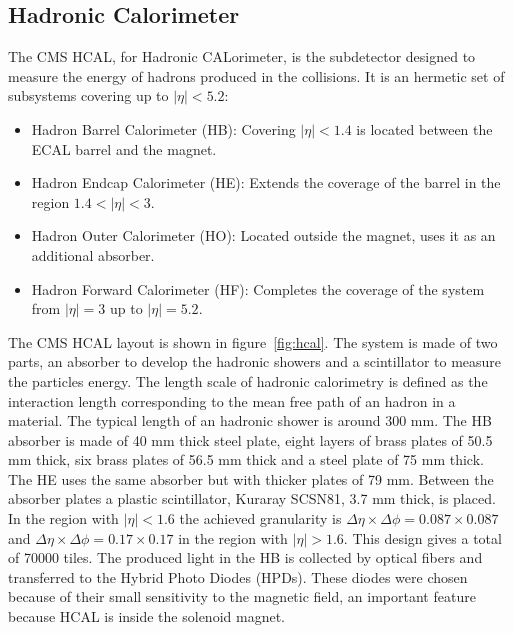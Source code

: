
\subsection{Hadronic Calorimeter}
\label{sec:hcal}

The CMS HCAL, for Hadronic CALorimeter, is the subdetector designed to measure the energy of hadrons produced in the collisions. It is an hermetic set of subsystems covering up to $|\eta|<5.2$:
\begin{itemize}
\item Hadron Barrel Calorimeter (HB): Covering $|\eta|<1.4$ is located between the ECAL barrel and the magnet. 
\item Hadron Endcap Calorimeter (HE): Extends the coverage of the barrel in the region $1.4<|\eta|<3$.
\item Hadron Outer Calorimeter (HO): Located outside the magnet, uses it as an additional absorber.
\item Hadron Forward Calorimeter (HF): Completes the coverage of the system from $|\eta|=3$ up to $|\eta|=5.2$.
\end{itemize}

The CMS HCAL layout is shown in figure~\ref{fig:hcal}. The system is made of two parts, an absorber to develop the hadronic showers and a scintillator to measure the particles energy. The length scale of hadronic calorimetry is defined as the interaction length corresponding to the mean free path of an hadron in a material. The typical length of an hadronic shower is around 300 mm. The HB absorber is made of 40 mm thick steel plate, eight layers of brass plates of 50.5 mm thick, six brass plates of 56.5 mm thick and a steel plate of 75 mm thick. The HE uses the same absorber but with thicker plates of 79 mm. Between the absorber plates a plastic scintillator, Kuraray SCSN81, 3.7 mm thick, is placed. In the region with $|\eta|<1.6$ the achieved granularity is $\Delta\eta\times\Delta\phi=0.087\times 0.087$ and $\Delta\eta\times\Delta\phi=0.17\times 0.17$ in the region with $|\eta|>1.6$. This design gives a total of 70000 tiles. The produced light in the HB is collected by optical fibers and transferred to the Hybrid Photo Diodes (HPDs). These diodes were chosen because of their small sensitivity to the magnetic field, an important feature because HCAL is inside the solenoid magnet. %

